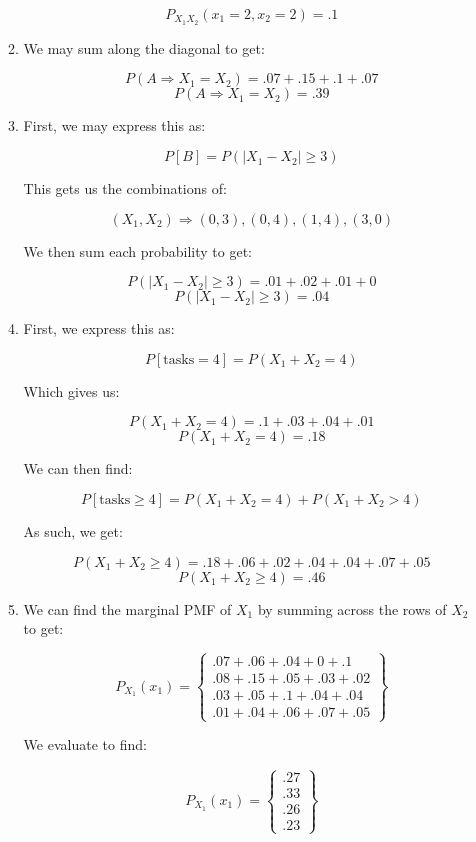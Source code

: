 \begin{enumerate}
\begin{enumerate}
        $$\boxed{P_{X_1X_2}(x_1=2,x_2=2)=.1}$$

      \item We may sum along the diagonal to get:

        $$P(A\Rightarrow X_1=X_2)=.07+.15+.1+.07$$
        $$\boxed{P(A\Rightarrow X_1=X_2)=.39}$$

      \item First, we may express this as:

        $$P[B]=P(|X_1-X_2|\geq 3)$$

        This gets us the combinations of:

        $$(X_1,X_2)\Rightarrow (0,3), (0,4), (1,4), (3,0)$$

        We then sum each probability to get:

        $$P(|X_1-X_2|\geq 3)=.01+.02+.01+0$$
        $$\boxed{P(|X_1-X_2|\geq 3)=.04}$$

      \item First, we express this as:

        $$P[\text{tasks} =4]=P(X_1+X_2=4)$$

        Which gives us:

        $$P(X_1+X_2=4)=.1+.03+.04+.01$$
        $$\boxed{P(X_1+X_2=4)=.18}$$

        We can then find:
        
        $$P[\text{tasks} \geq4]=P(X_1+X_2=4)+P(X_1+X_2>4)$$

        As such, we get:

        $$P(X_1+X_2\geq4)=.18 + .06+.02+.04+.04+.07+.05$$
        $$\boxed{P(X_1+X_2\geq4)=.46}$$

      \item We can find the marginal PMF of $X_1$ by summing across the rows of $X_2$ to get:

        $$P_{X_1}(x_1)=\left\{ \begin{matrix}.07+.06+.04+0+.1\\ .08+.15+.05+.03+.02\\ .03+.05+.1+.04+.04\\ .01+.04+.06+.07+.05 \end{matrix} \right\}$$

        We evaluate to find:

        $$\boxed{P_{X_1}(x_1)=\left\{ \begin{matrix}.27\\ .33\\ .26\\ .23 \end{matrix} \right\}}$$


\end{enumerate}
\end{enumerate}
